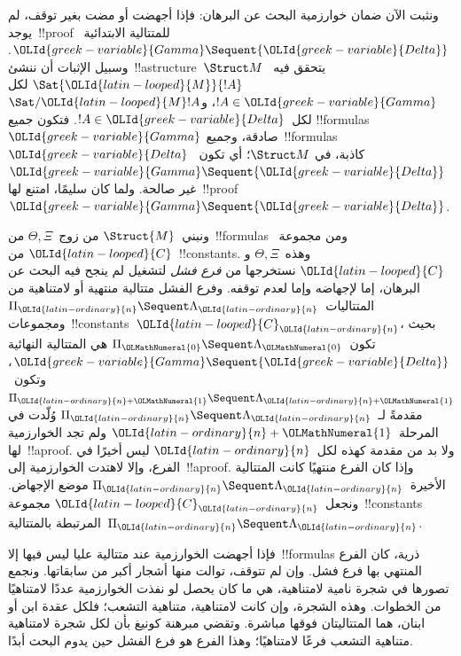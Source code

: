 \documentclass[../../../include/open-logic-section]{subfiles}
\begin{document}


ونثبت الآن ضمان خوارزمية البحث عن البرهان: فإذا أجهضت أو مضت بغير توقف،
لم يوجد~!!{proof} للمتتالية الابتدائية~${\OLId{greek-variable}{Gamma}} \Sequent {\OLId{greek-variable}{Delta}}$. وسبيل
الإثبات أن ننشئ~!!a{structure}~$\Struct M$ يتحقق فيه~$\Sat{{\OLId{latin-looped}{M}}}{!A}$ لكل
$!A \in {\OLId{greek-variable}{Gamma}}$، و$\Sat/{{\OLId{latin-looped}{M}}}{!A}$ لكل~$!A \in {\OLId{greek-variable}{Delta}}$. فتكون جميع
!!{formula}s~${\OLId{greek-variable}{Gamma}}$ صادقة، وجميع~!!{formula}s~${\OLId{greek-variable}{Delta}}$ كاذبة، في
$\Struct M$؛ أي تكون~${\OLId{greek-variable}{Gamma}} \Sequent {\OLId{greek-variable}{Delta}}$ غير صالحة. ولما كان
 سليمًا، امتنع لها~!!{proof}~${\OLId{greek-variable}{Gamma}} \Sequent {\OLId{greek-variable}{Delta}}$.

ونبني~$\Struct{M}$ من زوج~$\Theta,\Xi$ من~!!{formula}s ومن مجموعة~${\OLId{latin-looped}{C}}$
من~!!{constant}s. وهذه~$\Theta,\Xi$ و${\OLId{latin-looped}{C}}$ نستخرجها من \emph{فرع فشل}
لتشغيل لم ينجح فيه البحث عن البرهان، إما لإجهاضه وإما لعدم توقفه. وفرع
الفشل متتالية
منتهية أو لامتناهية من المتتاليات~$\Pi_{\OLId{latin-ordinary}{n}} \Sequent \Lambda_{\OLId{latin-ordinary}{n}}$
ومجموعات~!!{constant}s~${\OLId{latin-looped}{C}}_{\OLId{latin-ordinary}{n}}$، بحيث
تكون~$\Pi_{\OLMathNumeral{0}} \Sequent \Lambda_{\OLMathNumeral{0}}$ هي المتتالية النهائية
${\OLId{greek-variable}{Gamma}} \Sequent {\OLId{greek-variable}{Delta}}$، وتكون~$\Pi_{{\OLId{latin-ordinary}{n}}+{\OLMathNumeral{1}}} \Sequent \Lambda_{{\OLId{latin-ordinary}{n}}+{\OLMathNumeral{1}}}$ مقدمةً
لـ~$\Pi_{\OLId{latin-ordinary}{n}} \Sequent \Lambda_{\OLId{latin-ordinary}{n}}$ وُلّدت في المرحلة~${\OLId{latin-ordinary}{n}}+{\OLMathNumeral{1}}$ ولم تجد الخوارزمية
لها~!!a{proof}. ولا بد من مقدمة كهذه لكل~${\OLId{latin-ordinary}{n}}$ ليس أخيرًا في الفرع، وإلا
لاهتدت الخوارزمية إلى~!!a{proof}. وإذا كان الفرع منتهيًا كانت
المتتالية الأخيرة~$\Pi_{\OLId{latin-ordinary}{n}} \Sequent \Lambda_{\OLId{latin-ordinary}{n}}$ موضع الإجهاض. ونجعل~${\OLId{latin-looped}{C}}_{\OLId{latin-ordinary}{n}}$
مجموعة~!!{constant}s المرتبطة بالمتتالية~$\Pi_{\OLId{latin-ordinary}{n}} \Sequent \Lambda_{\OLId{latin-ordinary}{n}}$.

فإذا أجهضت الخوارزمية عند متتالية عليا ليس فيها إلا~!!{formula}s ذرية،
كان الفرع المنتهي بها فرع فشل. وإن لم تتوقف، توالت منها أشجار أكبر من
سابقاتها. ونجمع تصورها في شجرة نامية لامتناهية، هي ما كان يحصل لو نفذت
الخوارزمية عددًا لامتناهيًا من الخطوات. وهذه الشجرة، وإن كانت لامتناهية،
متناهية التشعب؛ فلكل عقدة ابن أو ابنان، هما المتتاليتان فوقها مباشرة.
وتقضي مبرهنة كونيغ بأن لكل شجرة لامتناهية متناهية التشعب فرعًا لامتناهيًا؛
وهذا الفرع هو فرع الفشل حين يدوم البحث أبدًا.
\end{document}
